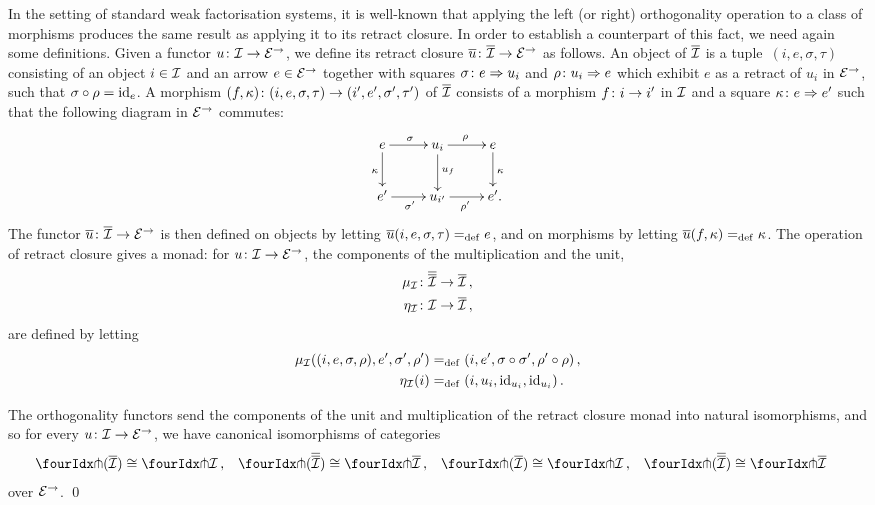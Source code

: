 \documentclass[reqno,10pt,a4paper,oneside,draft]{amsart}
\begin{document}
In the setting of standard weak factorisation systems, it is well-known that applying the left (or right) orthogonality operation to a class of morphisms produces the same result as applying it to its retract closure.
In order to establish a counterpart of this fact, we need again some definitions.
Given a functor $u \co \cal{I} \to \catE^\to$, we define its retract closure $\overline{u} \co \overline{\cal{I}} \to \catE^\to$ as follows.
An object of $\overline{\cal{I}}$ is a tuple~$(i, e, \sigma, \tau)$ consisting of an object $i \in \cal{I}$ and an arrow $e \in \cal{E}^\to$ together with squares $\sigma \co e \Rightarrow u_i$ and $\rho \co u_i \Rightarrow e$ which exhibit $e$ as a retract of $u_i$ in $\catE^\to$, \ie such that $\sigma \cc \rho = \id_e$. 
A morphism $(f, \kappa) \co (i, e, \sigma, \tau) \to (i', e', \sigma', \tau')$ of $\overline{\cal{I}}$ consists of a morphism $f \co i \to i'$ in $\cal{I}$ and a square $\kappa \co e \Rightarrow e'$ such that the following diagram in $\cal{E}^\to$ commutes:
\[
\xymatrix{
  e
  \ar[r]^{\sigma}
  \ar[d]_{\kappa}
&
  u_i
  \ar[r]^{\rho}
  \ar[d]^{u_f}
&
  e
  \ar[d]^{\kappa}
\\
  e'
  \ar[r]_{\sigma'}
&
  u_{i'}
  \ar[r]_{\rho'}
&
  e'
\rlap{.}}
\]
The functor $\overline{u} \co \overline{\cal{I}} \to \catE^\to$ is then defined on objects by letting $\overline{u}(i, e, \sigma, \tau) \defeq e$, and on morphisms by letting $\overline{u}(f, \kappa) \defeq \kappa$.
The operation of retract closure gives a monad: for $u \co \cal{I} \to \catE^\to$, the components of the multiplication and the unit,
\begin{align*}
  \mu_\cal{I} &\co \overline{\overline{\cal{I}}} \to \overline{\cal{I}}
\, ,\\
  \eta_\cal{I} &\co \cal{I} \to \overline{\cal{I}}
\, ,
\end{align*}
are defined by letting
\begin{align*}
  \mu_\cal{I}((i, e, \sigma, \rho), e', \sigma', \rho') &\defeq (i, e', \sigma \cc \sigma', \rho' \cc \rho)
\, ,\\
  \eta_\cal{I}(i) &\defeq (i, u_i, \id_{u_i}, \id_{u_i})
\, .
\end{align*}

\begin{proposition} \label{retract-closure}
The orthogonality functors send the components of the unit and multiplication of the retract closure monad into natural isomorphisms, and so for every $u \co \cal{I} \to \catE^\to$, we have canonical isomorphisms of categories
\begin{align*}
  \liftr{(\overline{\cal{I}})} &\iso \liftr{\cal{I}}
\, ,&
  \liftr{(\overline{\overline{\cal{I}}})} &\iso \liftr{\overline{\cal{I}}}
\, ,&
  \liftl{(\overline{\cal{I}})} &\iso \liftl{\cal{I}}
\, ,&
 \liftl{(\overline{\overline{\cal{I}}})} &\iso \liftl{\overline{\cal{I}}}
\end{align*}
over $\catE^\to$.
\qed
\end{proposition}
\end{document}

